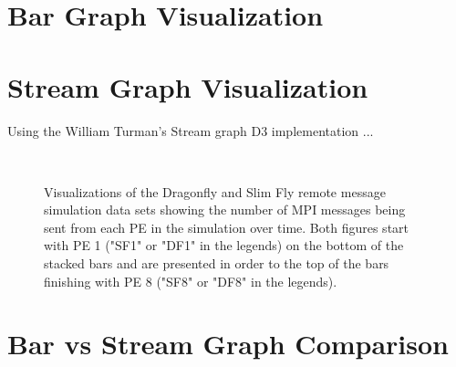 \documentclass[12pt]{article}
\begin{document}
\section{Bar Graph Visualization} \label{bar}


\section{Stream Graph Visualization} \label{stream}
Using the William Turman's Stream graph D3 implementation \cite{Stream}...

\begin{figure}[!ht]
     \centering
     \\
     \caption{Visualizations of the Dragonfly and Slim Fly remote message simulation data sets showing the number of MPI messages being sent from each PE in the simulation over time. Both figures start with PE 1 ("SF1" or "DF1" in the legends) on the bottom of the stacked bars and are presented in order to the top of the bars finishing with PE 8 ("SF8" or "DF8" in the legends).}
     \label{Area}
\end{figure}
%

\section{Bar vs Stream Graph Comparison}
 



\end{document}
